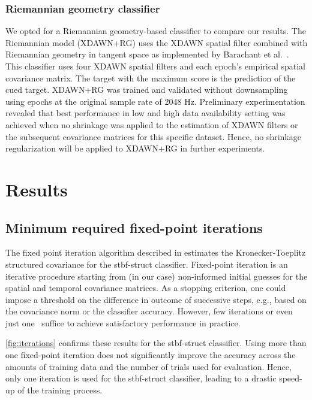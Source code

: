 	\subsubsection{Riemannian geometry classifier}
	\label{sec:riemannian}
	We opted for a Riemannian
	geometry-based classifier to compare our results.
	The Riemannian model (XDAWN+RG) uses the XDAWN spatial filter combined
	with Riemannian geometry in tangent space as implemented by Barachant et
	al.~\cite{Barachant2014a}.
	This classifier uses four XDAWN spatial filters and each epoch's empirical spatial covariance matrix.
	The target with the maximum score is the prediction of the cued target.
	XDAWN+RG was trained and validated without downsampling using epochs
	at the original sample rate of 2048 Hz.
  Preliminary experimentation revealed that best performance in low and high
  data availability setting was achieved when no shrinkage was applied to the estimation of XDAWN filters or the subsequent
  covariance matrices for this specific dataset.
  Hence, no shrinkage regularization will be applied to XDAWN+RG in
  further experiments.

	\section{Results}
	\subsection{Minimum required fixed-point iterations}
	The fixed point iteration algorithm described
	in
  estimates the Kronecker-Toeplitz structured covariance for the
	\ac{stbf-struct} classifier.
	Fixed-point iteration is an iterative procedure starting from (in our case)
	non-informed initial guesses for the spatial and temporal covariance matrices.
	As a stopping criterion, one could impose a threshold on the difference in
	outcome of successive steps, e.g., based on the covariance norm or the
	classifier accuracy.
	However, few iterations or even just one~\cite{Castaneda2014} suffice to achieve satisfactory performance in practice.

	\cref{fig:iterations} confirms these results for the \ac{stbf-struct} classifier.
	Using more than one fixed-point iteration does not significantly improve the
	accuracy across the amounts of training data and the number of trials
  used for evaluation.
	Hence, only one iteration is used for the \ac{stbf-struct} classifier, leading to a drastic speed-up of
  the  training process.

